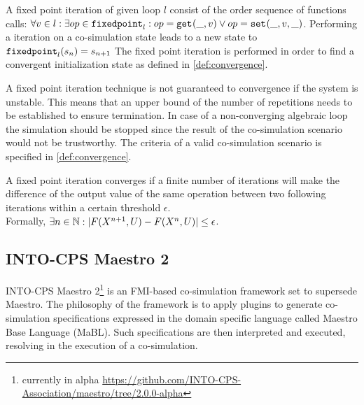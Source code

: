\begin{definition}\label{def:fixedpoint}
A fixed point iteration of given loop $l$ consist of the order sequence of functions calls:
$\forall v \in l: \exists op \in \mathtt{fixedpoint}_{l} : op = \mathtt{get}_{}(\_, v) \lor op = \mathtt{set}_{}(\_, v, \_)$.
Performing a iteration on a co-simulation state leads to a new state to $\mathtt{fixedpoint}_{l}(s_{n}) = s_{n + 1}$
The fixed point iteration is performed in order to find a convergent initialization state as defined in \cref{def:convergence}.
\end{definition}


A fixed point iteration technique is not guaranteed to convergence if the system is unstable. This means that an upper bound of the number of repetitions needs to be established to ensure termination. In case of a non-converging algebraic loop the simulation should be stopped since the result of the co-simulation scenario would not be trustworthy. The criteria of a valid co-simulation scenario is specified in \cref{def:convergence}.

\begin{definition}\label{def:convergence}
A fixed point iteration converges if a finite number of iterations will make the difference of the output value of the same operation between two following iterations within a certain threshold $\epsilon$.\\
Formally, 
$\exists n \in \mathbb{N}: |F(X^{n+1}, U) - F(X^{n}, U)| \leq \epsilon$.
\end{definition}

\subsection{INTO-CPS Maestro 2}
INTO-CPS Maestro 2\footnote{currently in alpha \url{https://github.com/INTO-CPS-Association/maestro/tree/2.0.0-alpha}}\cite{Thule2019b} is an FMI-based co-simulation framework set to supersede Maestro\cite{Maestro}. The philosophy of the framework is to apply plugins to generate co-simulation specifications expressed in the domain specific language called Maestro Base Language (MaBL). Such specifications are then interpreted and executed, resolving in the execution of a co-simulation.